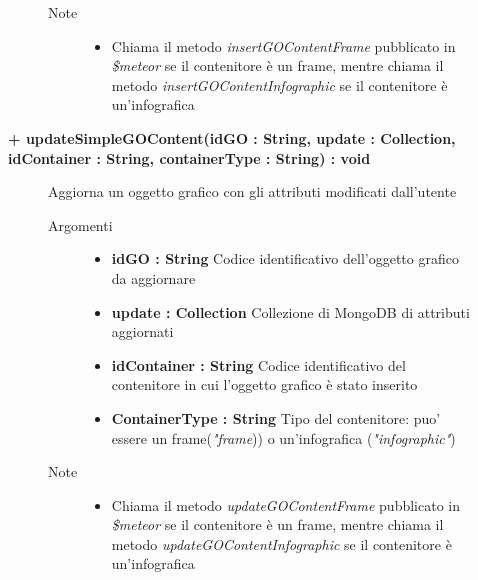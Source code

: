\begin{description}
\begin{description}
\begin{description}
\begin{itemize}
				\end{itemize}
			\item[Note] \hfill
			\begin{itemize}
					\item Chiama il metodo \textit{insertGOContentFrame} pubblicato in \textit{\$meteor} se il contenitore è un frame, mentre chiama il metodo \textit{insertGOContentInfographic} se il contenitore è un'infografica
			\end{itemize}
		\end{description}
	\end{description}
	
	\begin{description}
		\item[\textbf{\color{blue}+ updateSimpleGOContent(idGO : String, update : Collection, idContainer : String, containerType : String) : void			}] \hfill
			Aggiorna un oggetto grafico con gli attributi modificati dall'utente
			
		\begin{description}
			\item[Argomenti] \hfill
				\begin{itemize}
					\item \textbf{idGO : String			} \hfill
					Codice identificativo dell'oggetto grafico da aggiornare
					\item \textbf{update : Collection			} \hfill
					Collezione di MongoDB di attributi aggiornati
					\item \textbf{idContainer : String			} \hfill
					Codice identificativo del contenitore in cui l'oggetto grafico è stato inserito
					\item \textbf{ContainerType : String			} \hfill
					Tipo del contenitore: puo' essere un frame(\textit{"frame})) o un'infografica (\textit{"infographic"})
					
				\end{itemize}
			\item[Note] \hfill
			\begin{itemize}
					\item Chiama il metodo \textit{updateGOContentFrame} pubblicato in \textit{\$meteor} se il contenitore è un frame, mentre chiama il metodo \textit{updateGOContentInfographic} se il contenitore è un'infografica
			\end{itemize}
		\end{description}
	\end{description}
	

\end{description}
